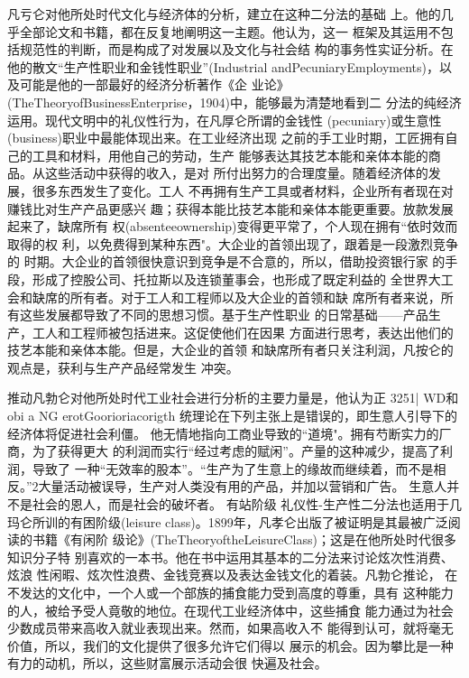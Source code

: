 凡亏仑对他所处时代文化与经济体的分析，建立在这种二分法的基础
上。他的几乎全部论文和书籍，都在反复地阐明这一主题。他认为，这一
框架及其运用不包括规范性的判断，而是构成了对发展以及文化与社会结
构的事务性实证分析。在他的散文“生产性职业和金钱性职业”(Industrial
andPecuniaryEmployments)，以及可能是他的一部最好的经济分析著作《企
业论》(TheTheoryofBusinessEnterprise，1904)中，能够最为清楚地看到二
分法的纯经济运用。现代文明中的礼仪性行为，在凡厚仑所谓的金钱性
(pecuniary)或生意性(business)职业中最能体现出来。在工业经济出现
之前的手工业时期，工匠拥有自己的工具和材料，用他自己的劳动，生产
能够表达其技艺本能和亲体本能的商品。从这些活动中获得的收入，是对
所付出努力的合理度量。随着经济体的发展，很多东西发生了变化。工人
不再拥有生产工具或者材料，企业所有者现在对赚钱比对生产产品更感兴
趣；获得本能比技艺本能和亲体本能更重要。放款发展起来了，缺席所有
权(absenteeownership)变得更平常了，个人现在拥有“依时效而取得的权
利，以免费得到某种东西"。大企业的首领出现了，跟着是一段激烈竞争的
时期。大企业的首领很快意识到竞争是不合意的，所以，借助投资银行家
的手段，形成了控股公司、托拉斯以及连锁董事会，也形成了既定利益的
全世界大工会和缺席的所有者。对于工人和工程师以及大企业的首领和缺
席所有者来说，所有这些发展都导致了不同的思想习惯。基于生产性职业
的日常基础——产品生产，工人和工程师被包括进来。这促使他们在因果
方面进行思考，表达出他们的技艺本能和亲体本能。但是，大企业的首领
和缺席所有者只关注利润，凡按仑的观点是，获利与生产产品经常发生
冲突。

推动凡勃仑对他所处时代工业社会进行分析的主要力量是，他认为正
3251|
WD和
obi
a
NG
erotGoorioriacorigth
统理论在下列主张上是错误的，即生意人引导下的经济体将促进社会利僵。
他无情地指向工商业导致的“道境"。拥有芍断实力的厂商，为了获得更大
的利润而实行“经过考虑的赋闲”。产量的这种减少，提高了利润，导致了
一种“无效率的股本”。“生产为了生意上的缘故而继续着，而不是相
反。”2大量活动被误导，生产对人类没有用的产品，并加以营销和广告。
生意人并不是社会的恩人，而是社会的破坏者。
有站阶级
礼仪性-生产性二分法也适用于几玛仑所训的有困阶级(leisure
class)。1899年，凡孝仑出版了被证明是其最被广泛阅读的书籍《有闲阶
级论》(TheTheoryoftheLeisureClass)；这是在他所处时代很多知识分子特
别喜欢的一本书。他在书中运用其基本的二分法来讨论炫次性消费、炫浪
性闲暇、炫次性浪费、金钱竞赛以及表达金钱文化的着装。凡勃仑推论，
在不发达的文化中，一个人或一个部族的捕食能力受到高度的尊重，具有
这种能力的人，被给予受人竟敬的地位。在现代工业经济体中，这些捕食
能力通过为社会少数成员带来高收入就业表现出来。然而，如果高收入不
能得到认可，就将毫无价值，所以，我们的文化提供了很多允许它们得以
展示的机会。因为攀比是一种有力的动机，所以，这些财富展示活动会很
快遍及社会。

